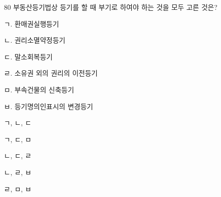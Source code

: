 \begin{question}{80}
부동산등기법상 등기를 할 때 부기로 하여야 하는 것을 모두 고른 것은?
\begin{framedtext}
ㄱ. 환매권실행등기 \par
ㄴ. 권리소멸약정등기 \par
ㄷ. 말소회복등기 \par
ㄹ. 소유권 외의 권리의 이전등기 \par
ㅁ. 부속건물의 신축등기 \par
ㅂ. 등기명의인표시의 변경등기
\end{framedtext}
\begin{choices}
  \item ㄱ, ㄴ, ㄷ
  \item ㄱ, ㄷ, ㅁ
  \item ㄴ, ㄷ, ㄹ
  \item ㄴ, ㄹ, ㅂ
  \item ㄹ, ㅁ, ㅂ
\end{choices}
\end{question}
